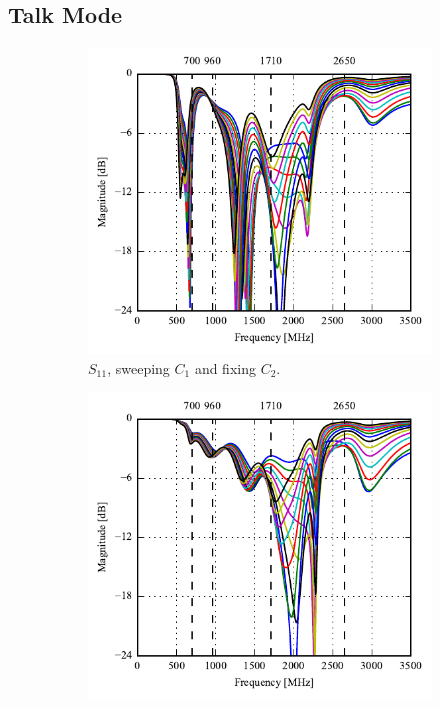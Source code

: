 \subsection{Talk Mode}
\begin{figure}[htbp]
   \begin{subfigure}[b]{0.49\linewidth}
        \centering
        \includegraphics{img/tech_sol/monopole/talk_mode/s11}
        \caption{$S_{11}$, sweeping $C_1$ and fixing $C_2$.}
        \label{fig:ant1_s11}
    \end{subfigure}
    \hfill
    \begin{subfigure}[b]{0.49\linewidth}
        \centering
        \includegraphics{img/tech_sol/monopole/talk_mode/s22}

\end{subfigure}
\end{figure}

